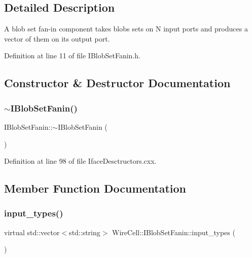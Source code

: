 \subsection{Detailed Description}
A blob set fan-\/in component takes blobs sets on N input ports and produces a vector of them on its output port. 

Definition at line 11 of file I\+Blob\+Set\+Fanin.\+h.



\subsection{Constructor \& Destructor Documentation}
\mbox{\label{class_wire_cell_1_1_i_blob_set_fanin_a7bac3d272182126348327a68f430bbd9}} 
\subsubsection{\texorpdfstring{$\sim$\+I\+Blob\+Set\+Fanin()}{~IBlobSetFanin()}}
{\footnotesize\ttfamily I\+Blob\+Set\+Fanin\+::$\sim$\+I\+Blob\+Set\+Fanin (\begin{DoxyParamCaption}{ }\end{DoxyParamCaption})\hspace{0.3cm}{\ttfamily [virtual]}}



Definition at line 98 of file Iface\+Desctructors.\+cxx.



\subsection{Member Function Documentation}
\mbox{\label{class_wire_cell_1_1_i_blob_set_fanin_a1783b57125c4b9df55a828ec832dbb72}} 
\subsubsection{\texorpdfstring{input\+\_\+types()}{input\_types()}}
{\footnotesize\ttfamily virtual std\+::vector$<$std\+::string$>$ Wire\+Cell\+::\+I\+Blob\+Set\+Fanin\+::input\+\_\+types (\begin{DoxyParamCaption}{ }\end{DoxyParamCaption})\hspace{0.3cm}{\ttfamily [pure virtual]}}



